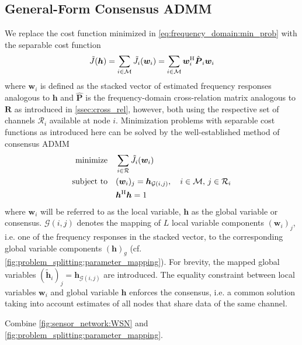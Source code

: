 \documentclass{article}
\newcommand{\hf}{{\bm{h}}}
\newcommand{\Rf}{{\bm{{R}}}}
\newcommand{\wf}{{\bm{w}}}
\newcommand{\aRhof}{{\bm{{P}}}}
\newcommand{\Cset}{\mathcal{C}}
\newcommand{\Mset}{\mathcal{M}}
\newcommand{\Rset}{\mathcal{R}}
\begin{document}
\subsection{General-Form Consensus ADMM}
\label{ssec:general_consensus_admm}
We replace the cost function minimized in \eqref{eq:frequency_domain:min_prob} with the separable cost function 
\begin{equation}
    \tilde{J}(\hf) = \sum_{i \in \Mset} \tilde{J}_i(\wf_i)  = \sum_{i \in \Mset} \wf_i^\herm \hat{\aRhof}_i \wf_i
    \label{eq:problem_splitting:cost_function}
\end{equation}
where \(\wf_i\) is defined as the stacked vector of estimated frequency responses analogous to \(\hf\) and \(\hat{\aRhof}\) is the frequency-domain cross-relation matrix analogous to \(\Rf\) as introduced in \autoref{ssec:cross_rel}, however, both using the respective set of channels \(\Rset_i\) available at node \(i\).
Minimization problems with separable cost functions as introduced here can be solved by the well-established method of consensus ADMM \cite{boydDistributedOptimizationStatistical2011}
\begin{align}
    \operatorname{minimize} \quad &\sum_{i \in \Rset} \tilde{J}_i(\wf_i)\\
    \text{subject to} \quad &(\wf_i)_j = \hf_{\mathcal{G}(i,j)},\quad i \in \Mset,\,j \in \Rset_i\\
    &\hf^\herm \hf = 1
\end{align}
where \(\wf_i\) will be referred to as the local variable, \(\hf\) as the global variable or consensus.
\(\mathcal{G}(i,j)\) denotes the mapping of \(L\) local variable components \((\wf_i)_j\), i.e. one of the frequency responses in the stacked vector, to the corresponding global variable components \((\hf)_g\) (cf. \autoref{fig:problem_splitting:parameter_mapping}).
For brevity, the mapped global variables \((\tilde{\hf}_i)_j = \hf_{\mathcal{G}(i,j)}\) are introduced.
The equality constraint between local variables \(\wf_i\) and global variable \(\hf\) enforces the consensus, i.e. a common solution taking into account estimates of all nodes that share data of the same channel.
\begin{todo}
    Combine \autoref{fig:sensor_network:WSN} and \autoref{fig:problem_splitting:parameter_mapping}.
\end{todo}
\end{document}
